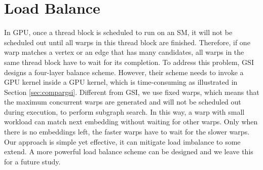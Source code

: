 \section{Load Balance} In GPU, once a thread block is scheduled to run on an SM, it will not be scheduled out until all warps in this
thread block are finished. Therefore, if one warp matches a vertex or an edge that has many candidates, all warps in the same thread block
have to wait for its completion. To address this problem, GSI designs a four-layer balance scheme. However, their scheme needs to invoke a
GPU kernel inside a GPU kernel, which is time-consuming as illustrated in Section \ref{sec:compargsi}. Different from GSI, we use fixed
warps, which means that the maximum concurrent warps are generated and will not be scheduled out during execution, to perform subgraph search.
In this way, a warp with small workload can match next embedding without waiting for other warps. Only when there is no embeddings left,
the faster warps have to wait for the slower warps. Our approach is simple yet effective, it can mitigate load imbalance to some extend. A
more powerful load balance scheme can be designed and we leave this for a future study.

